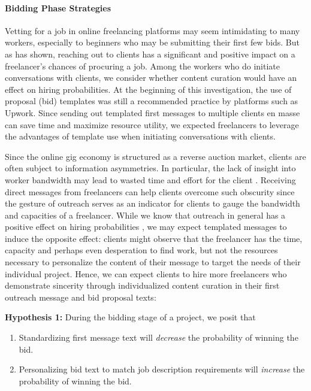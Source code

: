 \paragraph{Bidding Phase Strategies}
Vetting for a job in online freelancing platforms may seem intimidating to many workers, especially to beginners who may be submitting their first few bids. But as \cite{Hong2021-hj} {has} shown, reaching out to clients has a significant and positive impact on a freelancer's chances of procuring a job. Among the workers who do initiate conversations with clients, we consider whether content curation would have an effect on hiring probabilities. At the beginning of this investigation, the use of proposal (bid) templates was still a recommended practice by platforms such as Upwork. Since sending out templated first messages to multiple clients en masse can save time and maximize resource utility, we expected freelancers to leverage the advantages of template use when initiating conversations with clients. 

Since the online gig economy is structured as a reverse auction market, clients are often subject to information asymmetries. In particular, the lack of insight into worker bandwidth may lead to wasted time and effort for the client \cite{Horton2018-eq}. Receiving direct messages from freelancers can help clients overcome such obscurity since the gesture of outreach serves as an indicator for clients to gauge the bandwidth and capacities of a freelancer. While we know that outreach in general has a positive effect on hiring probabilities \cite{Hong2021-hj}, we may expect templated messages to induce the opposite effect: clients might observe that the freelancer has the time, capacity and perhaps even desperation \cite{dunn2020motivation} to find work, but not the resources necessary to personalize the content of their message to target the needs of their individual project. Hence, we can expect clients to hire more freelancers who demonstrate sincerity through individualized content curation in their first outreach message and bid proposal texts:
\newline

\textbf{Hypothesis 1:} During the bidding stage of a project, we posit that
\begin{enumerate} 
  \renewcommand{\labelenumi}{\alph{enumi}.}
    \item Standardizing first message text will \textit{decrease} the probability of winning the bid.
    \item Personalizing bid text to match job description requirements will \textit{increase} the probability of winning the bid.
\end{enumerate}

